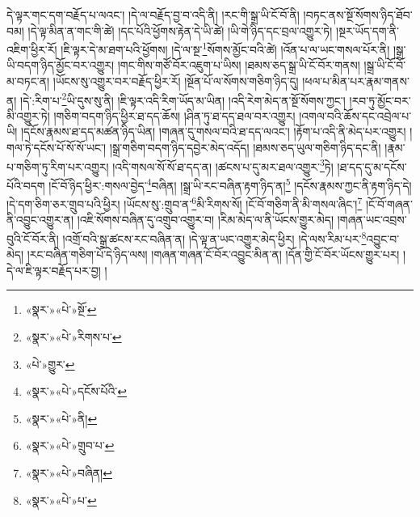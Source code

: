 དེ་ལྟར་གང་དག་བརྗོད་པ་ལའང་། །དེ་ལ་བརྗོད་བྱ་བ་འདི་ནི། །རང་གི་སྒྲ་ཡི་ངོ་བོ་ནི། །བཏང་ནས་སྔོ་སོགས་ཉིད་ཐོབ་བམ། །དེ་ལྟ་མིན་ན་གང་གི་ཚེ། །དང་པོའི་ཕྱོགས་རྟེན་དེ་ཡི་ཚེ། །ཡི་གེ་ཉིད་དང་བྲལ་འགྱུར་ཏེ། །སྔར་ཡོད་དག་ནི་འཇིག་ཕྱིར་རོ། །ཇི་ལྟར་དེ་མ་ཐག་པའི་ཕྱོགས། །དེ་ལ་སྔ་\footnote{«སྣར་»«པེ་»སྔོ་}སོགས་མྱོང་བའི་ཚེ། །འོན་པ་ལ་ཡང་གསལ་པོར་ནི། །སྒྲ་ཡི་བདག་ཉིད་མྱོང་བར་འགྱུར། །གང་གིས་གཙོ་བོར་འཇུག་པ་ཡིས། །ཐམས་ཅད་སྒྲ་ཡི་ངོ་བོར་གནས། །སྒྲ་ཡི་ངོ་བོ་མ་བཏང་ན། །ཡོངས་སུ་འགྱུར་བར་བརྗོད་ཕྱིར་རོ། །སྔོན་པོ་ལ་སོགས་གཅིག་ཉིད་དུ། །ཕལ་པ་མིན་པར་རྣམ་གནས་ན། །དེ་:རིག་པ་\footnote{«སྣར་»«པེ་»རིགས་པ་}ཡི་དུས་སུ་ནི། །ཇི་ལྟར་འདི་རིག་ཡོད་མ་ཡིན། །འདི་རེག་མེད་ན་སྔོ་སོགས་ཀྱང་། །རབ་ཏུ་མྱོང་བར་མི་འགྱུར་ཏེ། །གཅིག་བདག་ཉིད་ཕྱིར་ཐ་དད་ཆོས། །ཤིན་ཏུ་ཐ་དད་ཐལ་བར་འགྱུར། །འགལ་བའི་ཆོས་དང་འབྲེལ་པ་ཡི། །དངོས་རྣམས་ཐ་དད་མཚན་ཉིད་ཡིན། །གཞན་དུ་གསལ་བའི་ཐ་དད་ལའང་། །རྟོག་པ་འདི་ནི་མེད་པར་འགྱུར། །གལ་ཏེ་དངོས་པོ་སོ་སོ་ཡང་། །སྒྲ་གཅིག་བདག་ཉིད་དབྱེར་མེད་འདོད། །ཐམས་ཅད་ཡུལ་གཅིག་ཉིད་དང་ནི། །རྣམ་པ་གཅིག་ཏུ་རིག་པར་འགྱུར། །འདི་གསལ་སོ་སོ་ཐ་དད་ན། །ཚངས་པ་དུ་མར་ཐལ་འགྱུར་\footnote{«པེ་»གྱུར་}ཏེ། །ཐ་དད་དུ་མ་དངོས་པོའི་བདག །ངོ་བོ་ཉིད་ཕྱིར་:གསལ་བྱེད་\footnote{«སྣར་»«པེ་»དངོས་པོའི་}བཞིན། །སྒྲ་ཡི་རང་བཞིན་རྟག་ཉིད་ན།\footnote{«སྣར་»«པེ་»ནི།} །དངོས་རྣམས་ཀྱང་ནི་རྟག་ཉིད་དེ། །དེ་དག་ཅིག་ཅར་གྲུབ་པའི་ཕྱིར། །ཡོངས་སུ་:གྲུབ་ན་\footnote{«སྣར་»«པེ་»གྲུབ་པ་}མི་རིགས་སོ། །ངོ་བོ་གཅིག་ནི་མི་གསལ་ཞིང་།\footnote{«སྣར་»«པེ་»བཞིན།} །ངོ་བོ་གཞན་ནི་འབྱུང་འགྱུར་ན། །འཇི་སོགས་བཞིན་དུ་འགྲུབ་འགྱུར་བ། །རིམ་མེད་ལ་ནི་ཡོངས་གྱུར་མེད། །གཞན་ཡང་འབྲས་བུའི་ངོ་བོར་ནི། །འགྲོ་བའི་སྒྲ་ཚངས་རང་བཞིན་ན། །དེ་ལྟ་ན་ཡང་འགྱུར་མེད་ཕྱིར། །དེ་ལས་རིམ་པར་\footnote{«སྣར་»«པེ་»པ་}འབྱུང་བ་མེད། །རང་བཞིན་གཅིག་པོ་དེ་ཉིད་ལས། །གཞན་གཞན་ངོ་བོར་འབྱུང་མིན་ན། །དོན་གྱི་ངོ་བོར་ཡོངས་གྱུར་པར། །དེ་ལ་ཇི་ལྟར་བརྗོད་པར་བྱ། །
